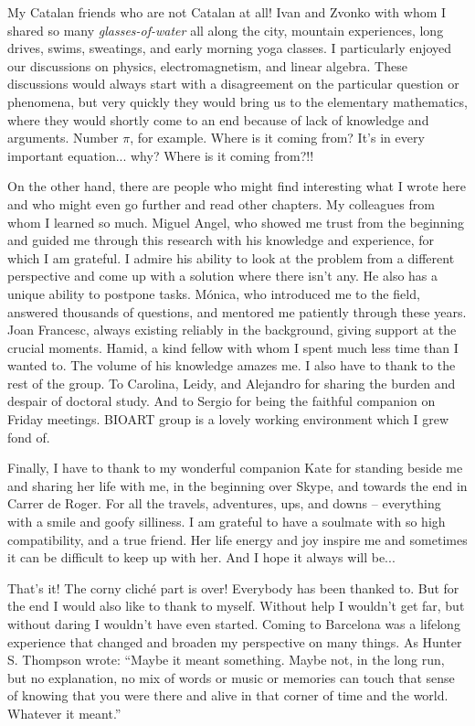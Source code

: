 \begin{acknowledgements}
My Catalan friends who are not Catalan at all! Ivan and Zvonko with whom I shared so many \emph{glasses-of-water} all along the city, mountain experiences, long drives, swims, sweatings, and early morning yoga classes. I particularly enjoyed our discussions on physics, electromagnetism, and linear algebra. These discussions would always start with a disagreement on the particular question or phenomena, but very quickly they would bring us to the elementary mathematics, where they would shortly come to an end because of lack of knowledge and arguments. Number $\pi$, for example. Where is it coming from? It's in every important equation... why? Where is it coming from?!!

On the other hand, there are people who might find interesting what I wrote here and who might even go further and read other chapters. My colleagues from whom I learned so much. Miguel Angel, who showed me trust from the beginning and guided me through this research with his knowledge and experience, for which I am grateful. I admire his ability to look at the problem from a different perspective and come up with a solution where there isn't any. He also has a unique ability to postpone tasks. Mónica, who introduced me to the field, answered thousands of questions, and mentored me patiently through these years. Joan Francesc, always existing reliably in the background, giving support at the crucial moments. Hamid, a kind fellow with whom I spent much less time than I wanted to. The volume of his knowledge amazes me. I also have to thank to the rest of the group. To Carolina, Leidy, and Alejandro for sharing the burden and despair of doctoral study. And to Sergio for being the faithful companion on Friday meetings. BIOART group is a lovely working environment which I grew fond of.

Finally, I have to thank to my wonderful companion Kate for standing beside me and sharing her life with me, in the beginning over Skype, and towards the end in Carrer de Roger. For all the travels, adventures, ups, and downs -- everything with a smile and goofy silliness. I am grateful to have a soulmate with so high compatibility, and a true friend. Her life energy and joy inspire me and sometimes it can be difficult to keep up with her. And I hope it always will be...

That's it! The corny cliché part is over! Everybody has been thanked to. But for the end I would also like to thank to myself. Without help I wouldn't get far, but without daring I wouldn't have even started. Coming to Barcelona was a lifelong experience that changed and broaden my perspective on many things. As Hunter S. Thompson wrote: “Maybe it meant something. Maybe not, in the long run, but no explanation, no mix of words or music or memories can touch that sense of knowing that you were there and alive in that corner of time and the world. Whatever it meant.”

\end{acknowledgements}